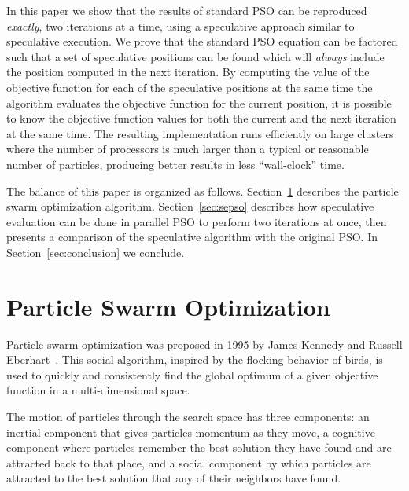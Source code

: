 \documentclass{llncs}
\renewcommand{\sec}[1]{Section~\ref{sec:#1}}
\begin{document}
In this paper we show that the results of standard PSO can be reproduced
\emph{exactly}, two iterations at a time, using a speculative approach similar
to speculative execution. We prove that the standard PSO equation can be
factored such that a set of speculative positions can be found which will
\emph{always} include the position computed in the next iteration.  By
computing the value of the objective function for each of the speculative
positions at the same time the algorithm evaluates the objective function for
the current position, it is possible to know the objective function values for
both the current and the next iteration at the same time.
The resulting implementation
runs efficiently on large clusters where the number of processors is much
larger than a typical or reasonable number of particles, producing better
results in less ``wall-clock'' time.

The balance of this paper is organized as follows. \sec{pso} describes the
particle swarm optimization algorithm.  \sec{sepso} describes how speculative
evaluation can be done in parallel PSO to perform two iterations at once, then
presents a comparison of the speculative algorithm with the original PSO.  In
\sec{conclusion} we conclude.

\section{Particle Swarm Optimization}
\label{sec:pso}

Particle swarm optimization was proposed in 1995 by James Kennedy and Russell
Eberhart~\cite{kennedy-1995-particle-swarm-optimization}.  This social
algorithm, inspired by the flocking behavior of birds, is used to quickly and
consistently find the global optimum of a given objective function in a
multi-dimensional space.

The motion of particles through the search space has three components: an
inertial component that gives particles momentum as they move, a cognitive
component where particles remember the best solution they have found and are
attracted back to that place, and a social component by which particles are
attracted to the best solution that any of their neighbors have found.
\end{document}
